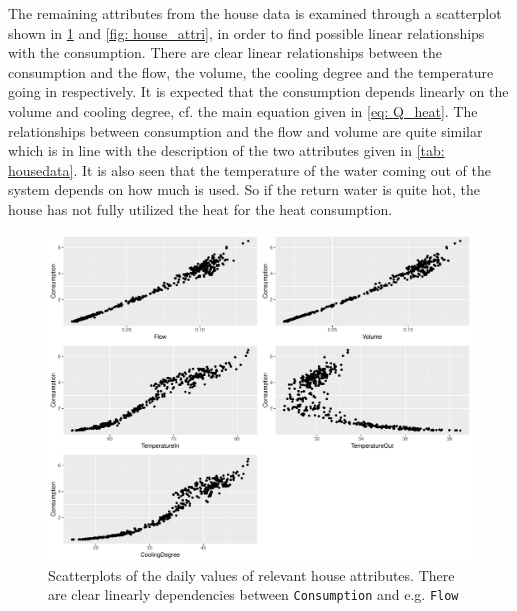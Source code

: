 \noindent The remaining attributes from the house data is examined through a scatterplot shown in \cref{fig: housepairs} and \cref{fig: house_attri}, in order to find possible linear relationships with the consumption. There are clear linear relationships between the consumption and the flow, the volume, the cooling degree and the temperature going in respectively. It is expected that the consumption depends linearly on the volume and cooling degree, cf. the main equation given in \cref{eq: Q_heat}. The relationships between consumption and the flow and volume are quite similar which is in line with the description of the two attributes given in \cref{tab: housedata}. It is also seen that the temperature of the water coming out of the system depends on how much is used. So if the return water is quite hot, 
the house has not fully utilized the heat for the heat consumption. 
\begin{figure}
    \centering
    \includegraphics[width=1.\textwidth]{../../../figures/housepairs.pdf}
    \caption{Scatterplots of the daily values of relevant house attributes. There are clear linearly dependencies between \texttt{Consumption} and e.g. \texttt{Flow}} 
    \label{fig: housepairs}
\end{figure}


